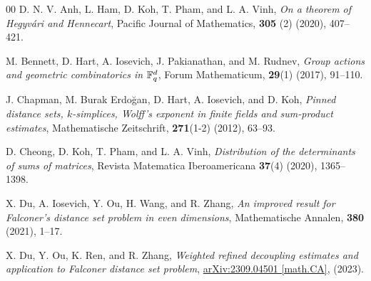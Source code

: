 \documentclass[11pt]{article}
\begin{document}
\begin{thebibliography}{00}
D. N. V. Anh, L. Ham, D. Koh, T. Pham, and L. A. Vinh, \textit{On a theorem of Hegyvári and Hennecart}, Pacific Journal of Mathematics, \textbf{305} (2) (2020), 407--421.


M. Bennett, D. Hart, A. Iosevich, J. Pakianathan, and M. Rudnev,
\textit{Group actions and geometric combinatorics in $\Bbb{F}_q^d$}, Forum Mathematicum, \textbf{29}(1) (2017), 91--110.






J. Chapman, M. Burak {Erdo\u{g}an}, D. Hart, A. Iosevich, and D. Koh,
\textit{Pinned distance sets, {$k$}-simplices, {W}olff's exponent in finite fields and sum-product estimates}, Mathematische Zeitschrift, \textbf{271}(1-2) (2012), 63--93.






D. Cheong, D. Koh, T. Pham, and L. A. Vinh, \textit{Distribution of the determinants of sums of matrices}, Revista Matematica Iberoamericana \textbf{37}(4) (2020),  1365--1398.



 X. Du, A.  Iosevich, Y. Ou, H. Wang, and R.  Zhang,  \textit{An improved result for Falconer's distance set problem in even dimensions}, Mathematische Annalen, \textbf{380} (2021), 1--17.

X. Du, Y. Ou, K. Ren, and R.  Zhang, \textit{Weighted refined decoupling estimates and application to Falconer distance set problem}, %
\href{https://arxiv.org/abs/2309.04501}{arXiv:2309.04501 [math.CA]}, (2023).




\end{thebibliography}
\end{document}
